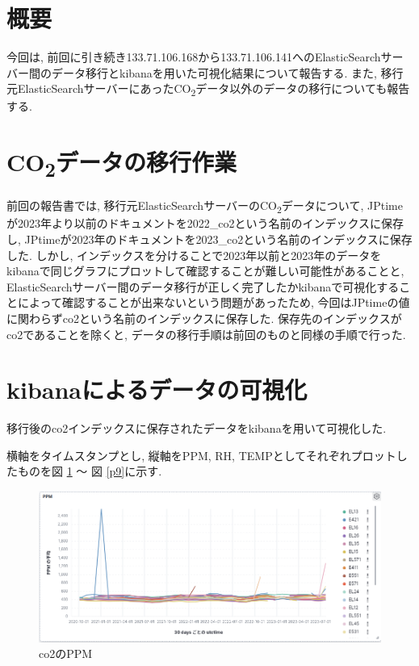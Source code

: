 \section{概要}
今回は, 前回に引き続き133.71.106.168から133.71.106.141へのElasticSearchサーバー間のデータ移行とkibanaを用いた可視化結果について報告する.
また, 移行元ElasticSearchサーバーにあったCO\textsubscript{2}データ以外のデータの移行についても報告する.

\section{CO\textsubscript{2}データの移行作業}
前回の報告書では, 移行元ElasticSearchサーバーのCO\textsubscript{2}データについて, JPtimeが2023年より以前のドキュメントを2022\_co2という名前のインデックスに保存し, JPtimeが2023年のドキュメントを2023\_co2という名前のインデックスに保存した.
しかし, インデックスを分けることで2023年以前と2023年のデータをkibanaで同じグラフにプロットして確認することが難しい可能性があることと, ElasticSearchサーバー間のデータ移行が正しく完了したかkibanaで可視化することによって確認することが出来ないという問題があったため, 今回はJPtimeの値に関わらずco2という名前のインデックスに保存した.
保存先のインデックスがco2であることを除くと, データの移行手順は前回のものと同様の手順で行った.

\section{kibanaによるデータの可視化}

移行後のco2インデックスに保存されたデータをkibanaを用いて可視化した.

横軸をタイムスタンプとし, 縦軸をPPM, RH, TEMPとしてそれぞれプロットしたものを図 \ref{p7} 〜 図 \ref{p9}に示す.

\begin{figure}[!ht]
    \begin{center}
        \includegraphics[width=160mm]{sotu/figure/ppm.png}
        \caption{co2のPPM}
        \label{p7}
    \end{center}
\end{figure}

